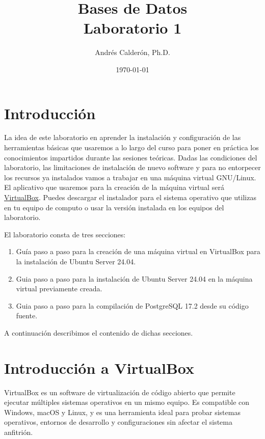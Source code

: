 \documentclass{article}
\title{Bases de Datos \\ Laboratorio 1}
\author{Andrés Calderón, Ph.D.}
\date{\today}
\begin{document}
\maketitle


\section{Introducción}
La idea de este laboratorio en aprender la instalación y configuración de las herramientas básicas que usaremos a lo largo del curso para poner en práctica los conocimientos impartidos durante las sesiones teóricas.  Dadas las condiciones del laboratorio, las limitaciones de instalación de nuevo software y para no entorpecer los recursos ya instalados vamos a trabajar en una máquina virtual GNU/Linux.  El aplicativo que usaremos para la creación de la máquina virtual será \href{https://www.virtualbox.org/wiki/Downloads}{VirtualBox}.  Puedes descargar el instalador para el sistema operativo que utilizas en tu equipo de computo o usar la versión instalada en los equipos del laboratorio. 

El laboratorio consta de tres secciones: 
\begin{enumerate}
    \item Guía paso a paso para la creación de una máquina virtual en VirtualBox para la instalación de Ubuntu Server 24.04.
    \item Guia paso a paso para la instalación de Ubuntu Server 24.04 en la máquina virtual previamente creada.
    \item Guia paso a paso para la compilación de PostgreSQL 17.2 desde su código fuente.
\end{enumerate}

A continuación describimos el contenido de dichas secciones.

\section{Introducción a VirtualBox}
VirtualBox es un software de virtualización de código abierto que permite ejecutar múltiples sistemas operativos en un mismo equipo. Es compatible con Windows, macOS y Linux, y es una herramienta ideal para probar sistemas operativos, entornos de desarrollo y configuraciones sin afectar el sistema anfitrión.
\end{document}
